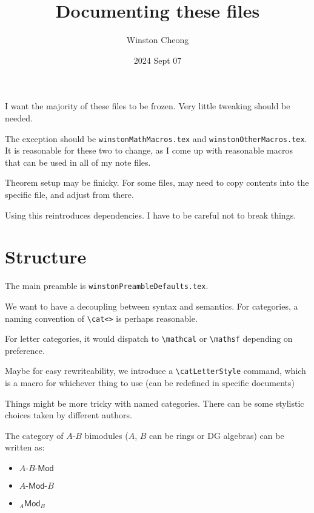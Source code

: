 \documentclass{scrartcl}
\title{Documenting these files}
\author{Winston Cheong}
\date{2024 Sept 07}
\begin{document}
\maketitle

I want the majority of these files to be frozen.
Very little tweaking should be needed.

The exception should be \texttt{winstonMathMacros.tex} and
\texttt{winstonOtherMacros.tex}.
It is reasonable for these two to change, as I come up with reasonable macros that can be used in all of my note files.

Theorem setup may be finicky. For some files, may need to copy contents into the
specific file, and adjust from there.



Using this reintroduces dependencies. I have to be careful not to break things.

\section{Structure}

The main preamble is \texttt{winstonPreambleDefaults.tex}.

We want to have a decoupling between syntax and semantics.
For categories, a naming convention of \verb|\cat<>| is perhaps reasonable.

For letter categories, it would dispatch to \verb|\mathcal| or \verb|\mathsf| depending on preference.

Maybe for easy rewriteability, we introduce a \verb|\catLetterStyle| command,
which is a macro for whichever thing to use (can be redefined in specific
documents)

Things might be more tricky with named categories. There can be some stylistic
choices taken by different authors.

The category of $A$-$B$ bimodules ($A$, $B$ can be rings or DG algebras) can be written as:
\begin{itemize}
    \item $A\text{-}B\text{-}\mathsf{Mod}$
    \item $A\text{-}\mathsf{Mod}\text{-}B$
    \item ${}_A\mathsf{Mod}_{B}$
\end{itemize}
\end{document}
